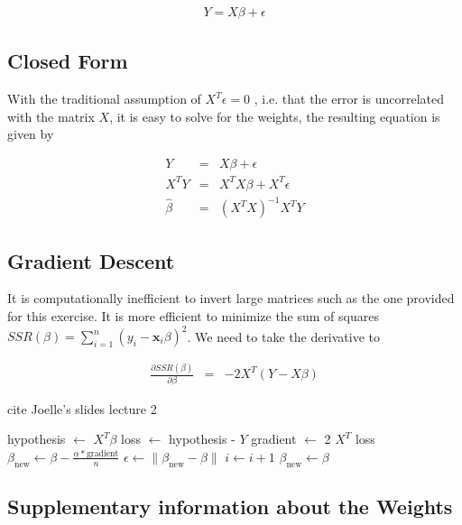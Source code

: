 \documentclass[conference]{IEEEtran}\usepackage[]{graphicx}\usepackage[]{color}
\begin{document}
\begin{eqnarray}
  Y = X \beta + \epsilon
\end{eqnarray}

\subsection{Closed Form}

With the traditional assumption of $X^T \epsilon = 0$
\cite{davidson2004econometric}, i.e. that the error is 
uncorrelated with the matrix $X$, it is easy to solve for the weights, the
resulting equation is given by

\begin{eqnarray}
  Y &=& X \beta + \epsilon \\
  X^T Y &=& X^T X \beta + X^T \epsilon \\
  \hat{\beta} &=& (X^TX)^{-1}X^TY 
\end{eqnarray}


\subsection{Gradient Descent}

It is computationally inefficient to invert large matrices such as the one
provided for this exercise. It is more efficient to minimize the sum of squares
$SSR(\beta) = \sum_{i=1}^n (y_i - \textbf{x}_i \beta)^2$. We need to take the derivative to 

\begin{eqnarray}
  \frac{\partial SSR(\beta)}{\partial \beta} &=& -2 X^T (Y-X \beta)
\end{eqnarray}

cite Joelle's slides lecture 2

\begin{algorithmic}
  \State hypothesis $\leftarrow$ $X^T \beta$
  \State loss $\leftarrow$ hypothesis - $Y$
  \State gradient $\leftarrow$ 2 $X^T$ loss
  \State $\beta_{\text{new}} \leftarrow \beta - \frac{\alpha *
    \text{gradient}}{n}$  
  \State $\epsilon \leftarrow \| \beta_{\text{new}} - \beta \| $ 
  \State $i \leftarrow i + 1$
  \State $\beta_{\text{new}} \leftarrow \beta$
  \EndWhile
\end{algorithmic}

\subsection{Supplementary information about the Weights}
\end{document}

